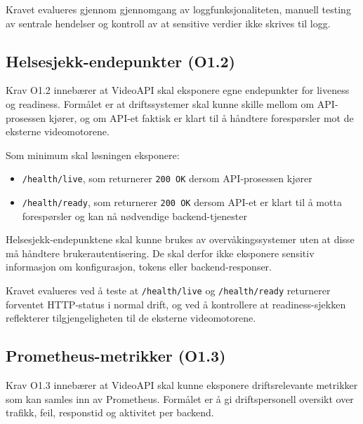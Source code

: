 Kravet evalueres gjennom gjennomgang av loggfunksjonaliteten, 
manuell testing av sentrale hendelser og kontroll av at sensitive 
verdier ikke skrives til logg.

\subsection{Helsesjekk-endepunkter (O1.2)}
\label{subsec:krav-o12}

Krav O1.2 innebærer at VideoAPI skal eksponere egne endepunkter 
for liveness og readiness. Formålet er at driftssystemer skal kunne 
skille mellom om API-prosessen kjører, og om API-et faktisk er klart 
til å håndtere forespørsler mot de eksterne videomotorene.

Som minimum skal løsningen eksponere:

\begin{itemize}
    \item \texttt{/health/live}, som returnerer \texttt{200 OK} dersom 
          API-prosessen kjører
    \item \texttt{/health/ready}, som returnerer \texttt{200 OK} dersom 
          API-et er klart til å motta forespørsler og kan nå nødvendige 
          backend-tjenester
\end{itemize}

Helsesjekk-endepunktene skal kunne brukes av overvåkingssystemer 
uten at disse må håndtere brukerautentisering. De skal derfor ikke eksponere sensitiv informasjon om konfigurasjon, tokens eller backend-responser.

Kravet evalueres ved å teste at \texttt{/health/live} og 
\texttt{/health/ready} returnerer forventet HTTP-status i normal drift, 
og ved å kontrollere at readiness-sjekken reflekterer tilgjengeligheten 
til de eksterne videomotorene.

\subsection{Prometheus-metrikker (O1.3)}
\label{subsec:krav-o13}
Krav O1.3 innebærer at VideoAPI skal kunne eksponere 
driftsrelevante metrikker som kan samles inn av Prometheus. 
Formålet er å gi driftspersonell oversikt over trafikk, feil, 
responstid og aktivitet per backend.

